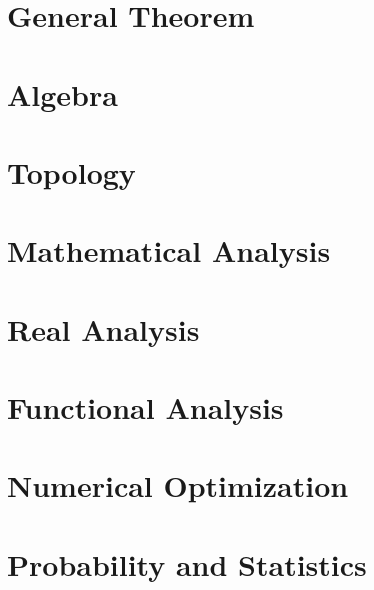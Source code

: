 \documentclass{phreebook}
\title{\theTitle}
\author{\theAuthor}
\date{\today}
\begin{document}
\maketitle
\tableofcontents

\part{General Theorem}





\part{Algebra}



\part{Topology}



\part{Mathematical Analysis}




\part{Real Analysis}






\part{Functional Analysis}








\part{Numerical Optimization}





\part{Probability and Statistics}


\glsaddall

\printglossaries
\printindex
\end{document}
